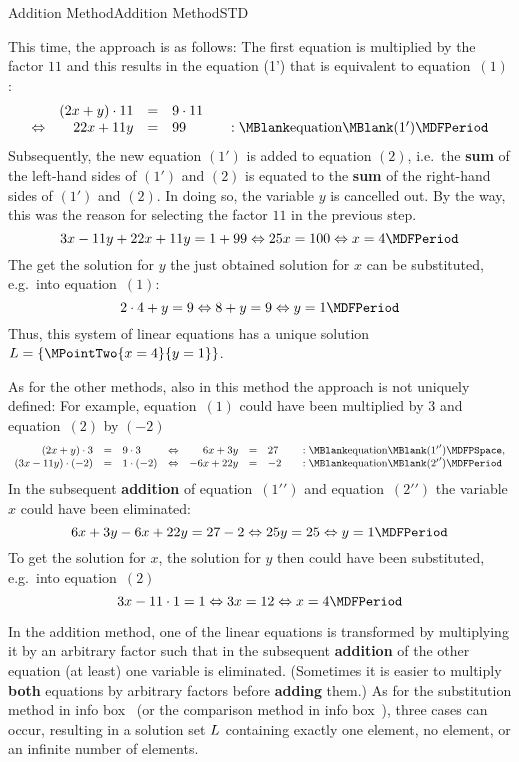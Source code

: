 \begin{MXContent}{Addition Method}{Addition Method}{STD}
\begin{MExample}
This time, the approach is as follows: The first equation is multiplied by the factor $11$ and this 
results in the equation (1') that is equivalent to equation~$(1)$: 
$$\begin{array}{crclcl} & (2 x + y) \cdot 11 & = & 9 \cdot 11 & & \\
\Leftrightarrow & 22 x + 11 y & = & 99 & & : \MBlank\mbox{equation}\MBlank (1') 
\MDFPeriod \end{array}$$
Subsequently, the new equation $(1')$ is added to equation $(2)$, i.e.\ the \textbf{sum}
of the left-hand sides of $(1')$ and $(2)$ is equated to the \textbf{sum} of
the right-hand sides of $(1')$ and $(2)$. In doing so, the variable $y$ is cancelled
out. By the way, this was the reason for selecting the factor $11$ in the previous step. 
$$3 x - 11 y + 22 x + 11 y = 1 + 99 \Leftrightarrow 25 x = 100 \Leftrightarrow x = 4 \MDFPeriod $$
The get the solution for $y$ the just obtained solution for $x$ can be substituted, e.g.\
into equation~$(1)$:
$$2 \cdot 4 + y = 9 \Leftrightarrow 8 + y = 9 \Leftrightarrow y = 1 \MDFPeriod$$
Thus, this system of linear equations has a unique solution ${\ML} =
\{ \MPointTwo{x = 4}{y = 1} \}$.
\end{MExample}
As for the other methods, also in this method the approach is not uniquely defined: 
For example, equation~$(1)$ could have been multiplied by $3$ and equation~$(2)$ by $(- 2)$
$$\begin{array}{rclcrclcl} (2x + y) \cdot 3 & = & 9 \cdot 3 & \Leftrightarrow & 6 x + 3 y & = & 27
& & : \MBlank\mbox{equation}\MBlank ({1'}') \MDFPSpace, \\ 
(3 x - 11 y) \cdot (- 2) & = & 1 \cdot (- 2) & \Leftrightarrow & - 6 x + 22 y & = & - 2
& & : \MBlank\mbox{equation}\MBlank ({2'}') \MDFPeriod\end{array}$$
In the subsequent \textbf{addition} of equation~$({1'}')$ and equation~$({2'}')$ the variable $x$ could have been
eliminated:
$$6 x + 3 y - 6 x + 22 y = 27 - 2 \Leftrightarrow 25 y = 25 \Leftrightarrow y = 1 \MDFPeriod$$
To get the solution for $x$, the solution for $y$ then could have been substituted, e.g.\ 
into equation~$(2)$
$$3 x - 11 \cdot 1 = 1 \Leftrightarrow 3 x = 12 \Leftrightarrow x = 4 \MDFPeriod$$
\begin{MInfo}
In the addition method, one of the linear equations is transformed by multiplying it by 
an arbitrary factor such that in the subsequent \textbf{addition} of the other equation
(at least) one variable is eliminated. (Sometimes it is easier to multiply 
\textbf{both} equations by arbitrary factors before \textbf{adding} them.)
As for the substitution method in info box~\MRef{M04_einsetzmethode} 
(or the comparison method in info box~\MRef{M04_gleichsetzmethode}), three cases can occur, 
resulting in a solution set $L$ containing exactly one element, no element, or an infinite number of
elements.
\end{MInfo}
\end{MXContent}

